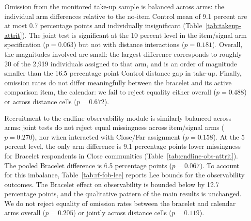 \documentclass[ECM\space ReStud.tex]{subfiles}
\begin{document}
Omission from the monitored take-up sample is balanced across
arms: the individual arm differences relative to the no-item Control
mean of 9.1 percent are at most 0.7 percentage points and individually
insignificant (Table~\ref{tab:takeup-attrit}). The joint test is
significant at the 10 percent level in the item/signal arm specification
(\(p = 0.063\)) but not with distance interactions (\(p = 0.181\)). Overall, the magnitudes involved are small: the largest difference corresponds to roughly 20 of
the  2{,}919 individuals assigned to that arm, and is an
order of magnitude smaller than the 16.5 percentage point Control
distance gap in take-up. Finally, omission rates do not differ meaningfully between the bracelet and its active comparison item, the calendar: we fail to reject equality either overall (\(p=0.488\)) or across distance cells (\(p=0.672\)).


Recruitment to the endline observability module is similarly balanced across
arms: joint tests do not reject equal missingness across item/signal arms (\(p = 0.270\)), nor when interacted with Close/Far assignment (\(p = 0.158\)). At the 5 percent level, the only arm difference is 9.1 percentage points lower missingness for Bracelet respondents in Close communities (Table~\ref{tab:endline-obs-attrit}). The pooled Bracelet difference is 6.5 percentage points (\(p=0.067\)). To account for this imbalance, Table~\ref{tab:rf-fob-lee} reports Lee
bounds for the observability outcomes. The Bracelet effect on
observability is bounded below by 12.7 percentage points, and the
qualitative pattern of the main results is unchanged. We do not reject equality of omission rates between the bracelet and calendar arms overall (\(p=0.205\)) or jointly across distance cells (\(p=0.119\)).
\end{document}
